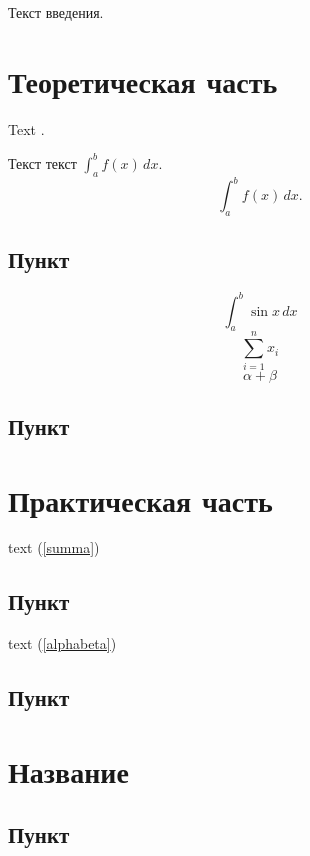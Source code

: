 \documentclass{timcw}
\begin{document}
\cwtitle

\tableofcontents
\clearpage

\intro

Текст введения.

\newpage
\chapter[Глава \thechapter. Теоретическая часть]{Теоретическая часть}
Text \cite{book1}.

Текст текст \( \int_a^b f(x)\,dx. \)
\[
\int_a^b f(x)\,dx.
\]

\section{Пункт}
\begin{equation}\label{integral}
  \int_{a}^b \sin x\,dx
\end{equation}
\begin{equation}\label{summa}
  \sum\limits_{i=1}^n x_i
\end{equation}
\begin{equation}\label{alphabeta}
  \alpha + \beta
\end{equation}

\section{Пункт}

\newpage
\chapter[Глава \thechapter. Практическая часть]{Практическая часть}
text (\ref{summa})

\section{Пункт}
text (\ref{alphabeta})

\section{Пункт}

\newpage
\chapter[Глава \thechapter. Название]{Название}
\section{Пункт}
\end{document}
